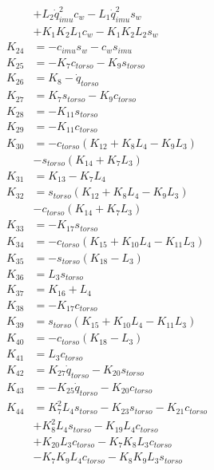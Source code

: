 \begin{multicols}{2}
\begin{align}
&+ L_2\dot{q}_{imu}^2c_{w} - L_1\dot{q}_{imu}^2s_{w}  \nonumber \\
&+ K_{1}K_{2}L_1c_{w} - K_{1}K_{2}L_2s_{w} \nonumber \\
K_{24} &= - c_{imu}s_{w} - c_{w}s_{imu} \nonumber \\
K_{25} &= - K_{7}c_{torso} - K_{9}s_{torso} \nonumber \\
K_{26} &= K_{8} - \dot{q}_{torso} \nonumber \\
K_{27} &= K_{7}s_{torso} - K_{9}c_{torso} \nonumber \\
K_{28} &= -K_{11}s_{torso} \nonumber \\
K_{29} &= -K_{11}c_{torso} \nonumber \\
K_{30} &= - c_{torso}(K_{12} + K_{8}L_4 - K_{9}L_3)  \nonumber \\
&- s_{torso}(K_{14} + K_{7}L_3) \nonumber \\
K_{31} &= K_{13} - K_{7}L_4 \nonumber \\
K_{32} &= s_{torso}(K_{12} + K_{8}L_4 - K_{9}L_3)  \nonumber \\
&- c_{torso}(K_{14} + K_{7}L_3) \nonumber \\
K_{33} &= -K_{17}s_{torso} \nonumber \\
K_{34} &= -c_{torso}(K_{15} + K_{10}L_4 - K_{11}L_3) \nonumber \\
K_{35} &= -s_{torso}(K_{18} - L_3) \nonumber \\
K_{36} &= L_3s_{torso} \nonumber \\
K_{37} &= K_{16} + L_4 \nonumber \\
K_{38} &= -K_{17}c_{torso} \nonumber \\
K_{39} &= s_{torso}(K_{15} + K_{10}L_4 - K_{11}L_3) \nonumber \\
K_{40} &= -c_{torso}(K_{18} - L_3) \nonumber \\
K_{41} &= L_3c_{torso} \nonumber \\
K_{42} &= K_{27}\dot{q}_{torso} - K_{20}s_{torso} \nonumber \\
K_{43} &= - K_{25}\dot{q}_{torso} - K_{20}c_{torso} \nonumber \\
K_{44} &= K_{7}^2L_4s_{torso} - K_{23}s_{torso} - K_{21}c_{torso}  \nonumber \\
&+ K_{8}^2L_4s_{torso} - K_{19}L_4c_{torso}  \nonumber \\
&+ K_{20}L_3c_{torso} - K_{7}K_{8}L_3c_{torso}  \nonumber \\
&- K_{7}K_{9}L_4c_{torso} - K_{8}K_{9}L_3s_{torso} \nonumber \\

\end{align}
\end{multicols}
